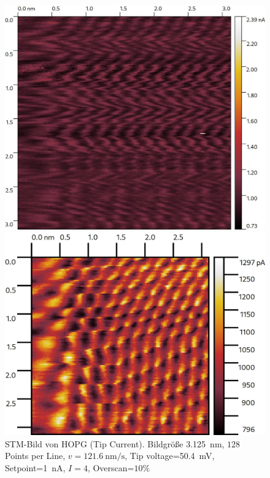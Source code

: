 \documentclass{article}
\begin{document}
\begin{figure}[h]
    \centering
    \begin{minipage}{0.49\textwidth}
        \centering
        \includegraphics[width=\textwidth]{Image20212}
        \caption{
            STM-Bild von HOPG (Tip Current). Bildgröße \SI{3.125}{\nm}, $512$ Points per Line,
            $v=\SI{20.7}{\nm\per\s}$, Tip voltage=\SI{150}{\mV}, Setpoint=\SI{1}{\nA}, $I=10$, Overscan=$5\%$
        }
        \label{fig:hopg-1}
    \end{minipage}
    \hfill
    \begin{minipage}{0.49\textwidth}
        \centering
        \includegraphics[width=\textwidth]{Image20215}
        \caption{
            STM-Bild von HOPG (Tip Current). Bildgröße \SI{3.125}{\nm}, $128$ Points per Line,
            $v=\SI{121.6}{\nm\per\s}$, Tip voltage=\SI{50.4}{\mV}, Setpoint=\SI{1}{\nA}, $I=4$, Overscan=$10\%$
        }
        \label{fig:hopg-2}
    \end{minipage}


\end{figure}
\end{document}
